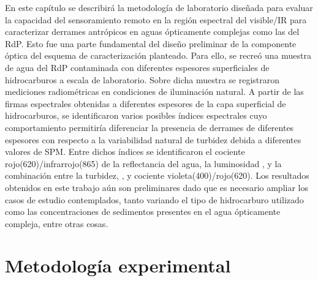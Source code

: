    En este capítulo se describirá la metodología de laboratorio diseñada para evaluar la capacidad del sensoramiento remoto en la región espectral del visible/IR para caracterizar derrames antrópicos en aguas ópticamente complejas como las del RdP. Esto fue una parte fundamental del diseño preliminar de la componente óptica del esquema de caracterización planteado.
    Para ello, se recreó una muestra de agua del RdP contaminada con diferentes espesores superficiales de hidrocarburos a escala de laboratorio. Sobre dicha muestra se registraron mediciones radiométricas en condiciones de iluminación natural. A partir de las firmas espectrales obtenidas a diferentes espesores de la capa superficial de hidrocarburos, se identificaron varios posibles índices espectrales cuyo comportamiento permitiría diferenciar la presencia de derrames de diferentes espesores con respecto a la variabilidad natural de turbidez debida a diferentes valores de SPM. Entre dichos índices se identificaron el cociente rojo(620)/infrarrojo(865) de la reflectancia del agua, la luminosidad \cite{cie2016}, y la combinación entre la turbidez, \cite{dogliotti2015}, y cociente violeta(400)/rojo(620).
    Los resultados obtenidos en este trabajo aún son preliminares dado que es necesario ampliar los casos de estudio contemplados, tanto variando el tipo de hidrocarburo utilizado como las concentraciones de sedimentos presentes en el agua ópticamente compleja, entre otras cosas.


\section{Metodología experimental}
\label{oil:s:experimental}

